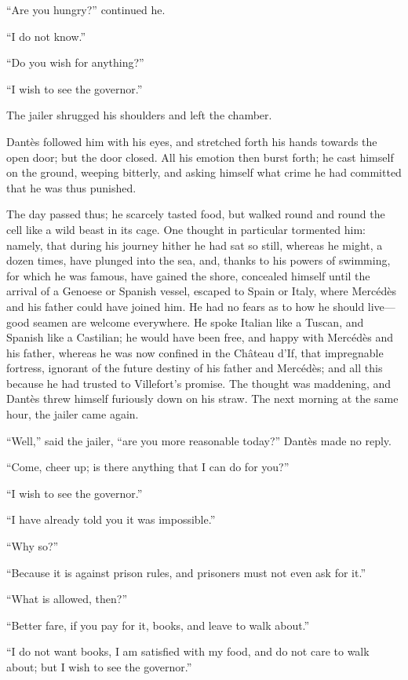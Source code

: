“Are you hungry?” continued he.

“I do not know.”

“Do you wish for anything?”

“I wish to see the governor.”

The jailer shrugged his shoulders and left the chamber.

Dantès followed him with his eyes, and stretched forth his hands
towards the open door; but the door closed. All his emotion then burst
forth; he cast himself on the ground, weeping bitterly, and asking
himself what crime he had committed that he was thus punished.

The day passed thus; he scarcely tasted food, but walked round and
round the cell like a wild beast in its cage. One thought in particular
tormented him: namely, that during his journey hither he had sat so
still, whereas he might, a dozen times, have plunged into the sea, and,
thanks to his powers of swimming, for which he was famous, have gained
the shore, concealed himself until the arrival of a Genoese or Spanish
vessel, escaped to Spain or Italy, where Mercédès and his father could
have joined him. He had no fears as to how he should live—good seamen
are welcome everywhere. He spoke Italian like a Tuscan, and Spanish
like a Castilian; he would have been free, and happy with Mercédès and
his father, whereas he was now confined in the Château d’If, that
impregnable fortress, ignorant of the future destiny of his father and
Mercédès; and all this because he had trusted to Villefort’s promise.
The thought was maddening, and Dantès threw himself furiously down on
his straw. The next morning at the same hour, the jailer came again.

“Well,” said the jailer, “are you more reasonable today?” Dantès made
no reply.

“Come, cheer up; is there anything that I can do for you?”

“I wish to see the governor.”

“I have already told you it was impossible.”

“Why so?”

“Because it is against prison rules, and prisoners must not even ask
for it.”

“What is allowed, then?”

“Better fare, if you pay for it, books, and leave to walk about.”

“I do not want books, I am satisfied with my food, and do not care to
walk about; but I wish to see the governor.”


